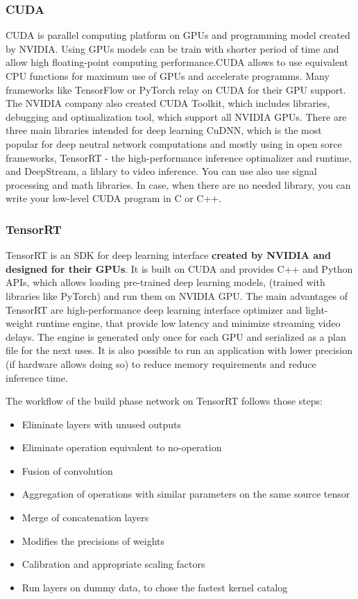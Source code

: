 \documentclass[../Main.tex]{subfiles}
\begin{document}
    \subsubsection{CUDA}
    CUDA is parallel computing platform on GPUs and programming model created by NVIDIA. Using GPUs models can be train with shorter period of time and allow high floating-point computing performance.CUDA allows to use equivalent CPU functions for maximum use of GPUs and accelerate programms. Many frameworks like TensorFlow or PyTorch relay on CUDA for their GPU support. The NVIDIA company also created CUDA Toolkit, which includes libraries, debugging and optimalization tool, which support all NVIDIA GPUs. There are three main libraries intended for deep learning CuDNN, which is the most popular for deep neutral network computations and mostly using in open sorce frameworks, TensorRT - the high-performance inference optimalizer and runtime, and DeepStream, a liblary to video inference. You can use also use signal processing and math libraries. In case, when there are no needed library, you can write your low-level CUDA program in C or C++.  
    
    \subsubsection{TensorRT} \label{trt_chapter}
    TensorRT is an SDK for deep learning interface \textbf{created by NVIDIA and designed for their GPUs}. It is built on CUDA and provides C++ and Python APIs, which allows loading pre-trained deep learning models, (trained with libraries like PyTorch) and run them on NVIDIA GPU. The main advantages of TensorRT are high-performance deep learning interface optimizer and light-weight runtime engine, that provide low latency and minimize streaming video delays. The engine is generated only once for each GPU and serialized as a plan file for the next uses. It is also possible to run an application with lower precision (if hardware allows doing so) to reduce memory requirements and reduce inference time. 
    
    The workflow of the build phase network on TensorRT follows those steps:
    \begin{itemize}
        \item Eliminate layers with unused outputs
        \item Eliminate operation equivalent to no-operation
        \item Fusion of convolution
        \item Aggregation of operations with similar parameters on the same source tensor 
        \item Merge of concatenation layers
        \item Modifies the precisions of weights 
        \item Calibration and appropriate scaling factors
        \item Run layers on dummy data, to chose the fastest kernel catalog
    \end{itemize}
    
\end{document}
